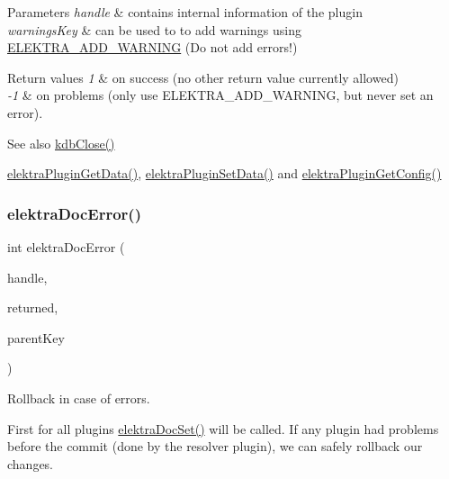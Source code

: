 \begin{DoxyParams}{Parameters}
{\em handle} & contains internal information of the plugin \\
\hline
{\em warnings\+Key} & can be used to to add warnings using \hyperlink{group__plugin_ga3da3bdb0f41710adda9eee3d7adac9ff}{E\+L\+E\+K\+T\+R\+A\+\_\+\+A\+D\+D\+\_\+\+W\+A\+R\+N\+I\+NG} (Do not add errors!)\\
\hline
\end{DoxyParams}

\begin{DoxyRetVals}{Return values}
{\em 1} & on success (no other return value currently allowed)\\
\hline
{\em -\/1} & on problems (only use E\+L\+E\+K\+T\+R\+A\+\_\+\+A\+D\+D\+\_\+\+W\+A\+R\+N\+I\+NG, but never set an error).\\
\hline
\end{DoxyRetVals}
\begin{DoxySeeAlso}{See also}
\hyperlink{group__kdb_gadb54dc9fda17ee07deb9444df745c96f}{kdb\+Close()} 

\hyperlink{group__plugin_gaafcf3216b46292f222b8cc7828b4dd20}{elektra\+Plugin\+Get\+Data()}, \hyperlink{group__plugin_gaf4b941a52ff55d0ca2a9158d90208ef2}{elektra\+Plugin\+Set\+Data()} and \hyperlink{group__plugin_ga644bead796506c172817724051c977c9}{elektra\+Plugin\+Get\+Config()} 
\end{DoxySeeAlso}
\mbox{\label{group__plugin_gad74b35f558ac7c3262f6069c5c47dc79}} 
\subsubsection{\texorpdfstring{elektra\+Doc\+Error()}{elektraDocError()}}
{\footnotesize\ttfamily int elektra\+Doc\+Error (\begin{DoxyParamCaption}\item[{Plugin $\ast$}]{handle,  }\item[{Key\+Set $\ast$}]{returned,  }\item[{Key $\ast$}]{parent\+Key }\end{DoxyParamCaption})}



Rollback in case of errors. 

First for all plugins \hyperlink{group__plugin_gae65781a1deb34efc79c8cb9d9174842c}{elektra\+Doc\+Set()} will be called. If any plugin had problems before the commit (done by the resolver plugin), we can safely rollback our changes.

